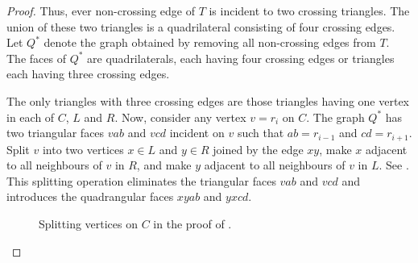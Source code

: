 \documentclass{patmorin}
\begin{document}
\begin{proof}
   Thus, ever non-crossing edge of $T$ is incident to two crossing
   triangles.  The union of these two triangles is a quadrilateral
   consisting of four crossing edges.  Let $Q^*$ denote the graph obtained
   by removing all non-crossing edges from $T$.  The faces of $Q^*$
   are quadrilaterals, each having four crossing edges or triangles each
   having three crossing edges.

   The only triangles with three crossing edges are those triangles
   having one vertex in each of $C$, $L$ and $R$.  Now, consider any
   vertex $v=r_i$ on $C$.  The graph $Q^*$ has two triangular faces $vab$
   and $vcd$ incident on $v$ such that $ab=r_{i-1}$ and $cd=r_{i+1}$.
   Split $v$ into two vertices $x\in L$ and $y\in R$ joined by the edge
   $xy$, make $x$ adjacent to all neighbours of $v$ in $R$, and make
   $y$ adjacent to all neighbours of $v$ in $L$. See .
   This splitting operation eliminates the triangular faces $vab$ and
   $vcd$ and introduces the quadrangular faces $xyab$ and $yxcd$.

   \begin{figure}
      \caption{Splitting vertices on $C$ in the proof of
      .}
   \end{figure}


\end{proof}
\end{document}
